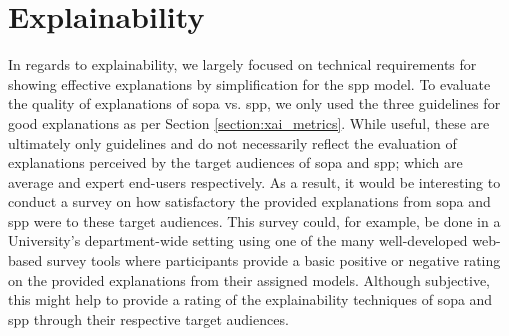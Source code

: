 \section{Explainability}

In regards to explainability, we largely focused on technical requirements
for showing effective explanations by simplification for the \ac{spp} model. To
evaluate the quality of explanations of \ac{sopa} vs. \ac{spp}, we only used the three
guidelines for good explanations as per Section \ref{section:xai_metrics}. While
useful, these are ultimately only guidelines and do not necessarily reflect the
evaluation of explanations perceived by the target audiences of \ac{sopa} and \ac{spp};
which are average and expert end-users respectively. As a result, it would
be interesting to conduct a survey on how satisfactory the provided explanations
from \ac{sopa} and \ac{spp} were to these target audiences. This survey could, for
example, be done in a University's department-wide setting using one of the many
well-developed web-based survey tools where participants provide a basic
positive or negative rating on the provided explanations from their assigned
models. Although subjective, this might help to provide a rating of the
explainability techniques of \ac{sopa} and \ac{spp} through their respective target
audiences.


